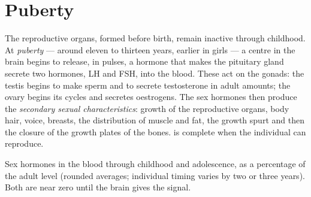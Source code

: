 \section{Puberty}

\begin{proposition}[Puberty]\label{prop:g11:becoming-male-female:puberty}
The reproductive organs, formed before birth, remain inactive
through childhood. At \emph{puberty} --- around eleven
to thirteen years, earlier in girls --- a centre in the brain begins to
release, in pulses, a hormone that makes the pituitary gland secrete
two hormones, LH and FSH, into the blood. These act on the gonads:
the testis begins to make sperm and to secrete testosterone in
adult amounts; the ovary begins its cycles and secretes oestrogens.
The sex hormones then produce the \emph{secondary sexual
characteristics}: growth of the reproductive organs, body hair,
voice, breasts, the distribution of muscle and fat, the growth spurt
and then the closure of the growth plates of the bones.  is
complete when the individual can reproduce.
\end{proposition}
\admitted

\begin{omfigure}

{\small Sex hormones in the blood through childhood and adolescence,
as a percentage of the adult level (rounded averages; individual
timing varies by two or three years). Both are near zero until the
brain gives the signal.}
\end{omfigure}

